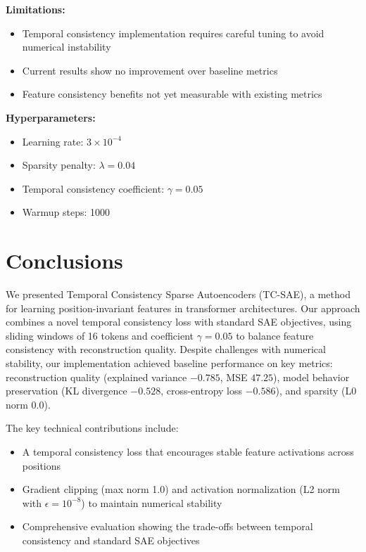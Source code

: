 \documentclass{article} %
\begin{document}
\textbf{Limitations:}
\begin{itemize}
    \item Temporal consistency implementation requires careful tuning to avoid numerical instability
    \item Current results show no improvement over baseline metrics
    \item Feature consistency benefits not yet measurable with existing metrics
\end{itemize}

\textbf{Hyperparameters:}
\begin{itemize}
    \item Learning rate: $3 \times 10^{-4}$
    \item Sparsity penalty: $\lambda=0.04$
    \item Temporal consistency coefficient: $\gamma=0.05$
    \item Warmup steps: 1000
\end{itemize}

\section{Conclusions}
\label{sec:conclusion}

We presented Temporal Consistency Sparse Autoencoders (TC-SAE), a method for learning position-invariant features in transformer architectures. Our approach combines a novel temporal consistency loss with standard SAE objectives, using sliding windows of 16 tokens and coefficient $\gamma=0.05$ to balance feature consistency with reconstruction quality. Despite challenges with numerical stability, our implementation achieved baseline performance on key metrics: reconstruction quality (explained variance $-0.785$, MSE $47.25$), model behavior preservation (KL divergence $-0.528$, cross-entropy loss $-0.586$), and sparsity (L0 norm $0.0$).

The key technical contributions include:
\begin{itemize}
    \item A temporal consistency loss that encourages stable feature activations across positions
    \item Gradient clipping (max norm 1.0) and activation normalization (L2 norm with $\epsilon=10^{-8}$) to maintain numerical stability
    \item Comprehensive evaluation showing the trade-offs between temporal consistency and standard SAE objectives
\end{itemize}
\end{document}
